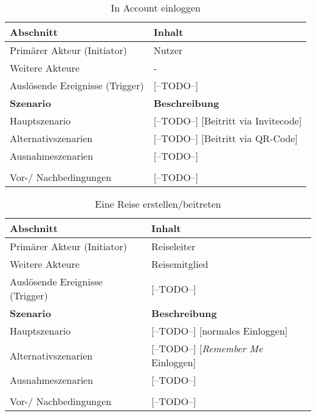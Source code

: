 \begin{table}[H]
	\caption{In Account einloggen}
	\begin{tabularx}{0.95\textwidth}{ |X|X| }
		\hline
		\rowcolor{gray} \textbf{Abschnitt}     & \textbf{Inhalt}                      \\
		\hline
		Primärer Akteur (Initiator)            & Nutzer                               \\
		\hline
		Weitere Akteure                        & -                                    \\
		\hline
		Auslösende Ereignisse (Trigger)        & [--TODO--]                           \\
		\hline
		\rowcolor{lightgray} \textbf{Szenario} & \textbf{Beschreibung}                \\
		\hline
		Hauptszenario                          & [--TODO--] [Beitritt via Invitecode] \\
		\hline
		Alternativszenarien                    & [--TODO--] [Beitritt via QR-Code]    \\
		\hline
		Ausnahmeszenarien                      & [--TODO--]                           \\
		\hline
		\rowcolor{lightgray}                   &                                      \\
		\hline
		Vor-/ Nachbedingungen                  & [--TODO--]                           \\
		\hline
	\end{tabularx}
\end{table}


\begin{table}[H]
	\caption{Eine Reise erstellen/beitreten}
	\begin{tabularx}{0.95\textwidth}{ |X|X| }
		\hline
		\rowcolor{gray} \textbf{Abschnitt}     & \textbf{Inhalt}                           \\
		\hline
		Primärer Akteur (Initiator)            & Reiseleiter                               \\
		\hline
		Weitere Akteure                        & Reisemitglied                             \\
		\hline
		Auslösende Ereignisse (Trigger)        & [--TODO--]                                \\
		\hline
		\rowcolor{lightgray} \textbf{Szenario} & \textbf{Beschreibung}                     \\
		\hline
		Hauptszenario                          & [--TODO--] [normales Einloggen]           \\
		\hline
		Alternativszenarien                    & [--TODO--] [\emph{Remember Me} Einloggen] \\
		\hline
		Ausnahmeszenarien                      & [--TODO--]                                \\
		\hline
		\rowcolor{lightgray}                   &                                           \\
		\hline
		Vor-/ Nachbedingungen                  & [--TODO--]                                \\
		\hline
	\end{tabularx}
\end{table}


